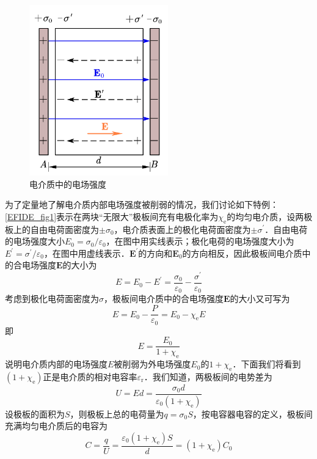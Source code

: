 \begin{figure}[ht]
\centering
\includegraphics[width=6cm]{./figures/EFIDE_1.pdf}
\caption{电介质中的电场强度} \label{EFIDE_fig1}
\end{figure}
为了定量地了解电介质内部电场强度被削弱的情况，我们讨论如下特例：\autoref{EFIDE_fig1}表示在两块“无限大”极板间充有电极化率为$\chi_\mathrm{e}$的均匀电介质，设两极板上的自由电荷面密度为$\pm \sigma_0$，电介质表面上的极化电荷面密度为$\pm \sigma^\prime$．自由电荷的电场强度大小$E_{0}=\sigma_{0} / \varepsilon_{0}$，在图中用实线表示；极化电荷的电场强度大小为$E^{\prime}=\sigma^{\prime} / \varepsilon_{0}$，在图中用虚线表示．$\mathbf E^\prime$的方向和$\mathbf E_0$的方向相反，因此极板间电介质中的合电场强度$\mathbf E $的大小为
\begin{equation}
E=E_{0}-E^{\prime}=\frac{\sigma_{0}}{\varepsilon_{0}}-\frac{\sigma^{\prime}}{\varepsilon_{0}}
\end{equation}
考虑到极化电荷面密度为$\sigma$，极板间电介质中的合电场强度$\mathbf E $的大小又可写为
\begin{equation}
E=E_{0}-\frac{P}{\varepsilon_{0}}=E_{0}-\chi_{\mathrm e} E
\end{equation}
即
\begin{equation} \label{EFIDE_eq1}
E=\frac{E_{0}}{1+\chi_{\mathrm{e}}}
\end{equation}
说明电介质内部的电场强度$E $被削弱为外电场强度$E_0$的${1+\chi_{\mathrm{e}}}$．下面我们将看到$({1+\chi_{\mathrm{e}}})$正是电介质的相对电容率$\varepsilon_\mathrm{r}$．我们知道，两极板间的电势差为
\begin{equation}
U=E d=\frac{\sigma_{0} d}{\varepsilon_{0}\left(1+\chi_{\mathrm e}\right)}
\end{equation}
设极板的面积为$S$，则极板上总的电荷量为$q=\sigma_{0} S$，按电容器电容的定义，极板间充满均匀电介质后的电容为
\begin{equation}
C=\frac{q}{U}=\frac{\varepsilon_{0}\left(1+\chi_{\mathrm e}\right) S}{d}=\left(1+\chi_{\mathrm e}\right) C_{0}
\end{equation}
